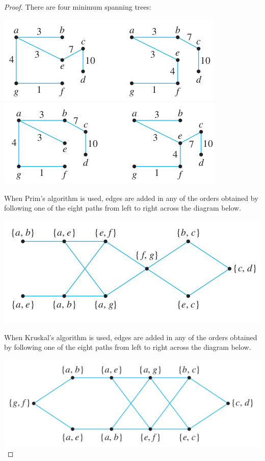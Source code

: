 \documentclass[14pt]{extarticle}
\begin{document}
\begin{proof}
    There are four minimum spanning trees:

    \includegraphics[scale=0.5]{../images/10.6.9.a.png}
    \includegraphics[scale=0.5]{../images/10.6.9.b.png}

    When Prim’s algorithm is used, edges are added in any of the orders obtained by following one of the eight paths from left
    to right across the diagram below.

    \includegraphics[scale=0.5]{../images/10.6.9.c.png}

    When Kruskal’s algorithm is used, edges are added in any of the orders obtained by following one of the eight paths from
    left to right across the diagram below.

    \includegraphics[scale=0.5]{../images/10.6.9.d.png}
\end{proof}
\end{document}

